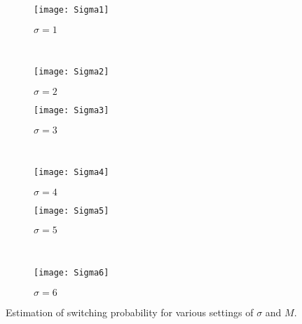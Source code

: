 \begin{figure}
	\centering
	\begin{subfigure}[b]{0.48\textwidth}
		\texttt{[image: Sigma1]}
		\caption{$\sigma=1$}
	\end{subfigure}
	~~ %
	\begin{subfigure}[b]{0.48\textwidth}
		\texttt{[image: Sigma2]}
		\caption{$\sigma=2$}
	\end{subfigure}
	
	\begin{subfigure}[b]{0.48\textwidth}
		\texttt{[image: Sigma3]}
		\caption{$\sigma=3$}
	\end{subfigure}
	~~ %
	\begin{subfigure}[b]{0.48\textwidth}
		\texttt{[image: Sigma4]}
		\caption{$\sigma=4$}
	\end{subfigure}
	
	\begin{subfigure}[b]{0.48\textwidth}
		\texttt{[image: Sigma5]}
		\caption{$\sigma=5$}
	\end{subfigure}
	~~ %
	\begin{subfigure}[b]{0.48\textwidth}
		\texttt{[image: Sigma6]}
		\caption{$\sigma=6$}
	\end{subfigure}
	\caption{Estimation of switching probability for various settings of $\sigma$ and $M$.}\label{fig:supp-expectedswitch}
\end{figure}


